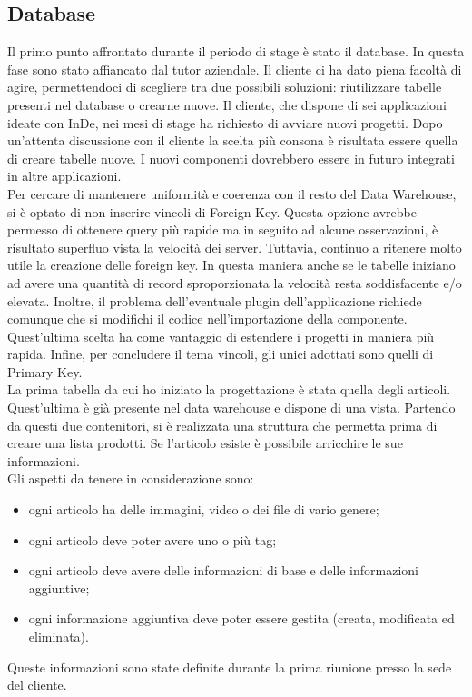 \subsection{Database}
Il primo punto affrontato durante il periodo di stage è stato il database. In questa fase sono stato affiancato dal tutor aziendale. Il cliente ci ha dato piena facoltà di agire, permettendoci di scegliere tra due possibili soluzioni: riutilizzare tabelle presenti nel database o crearne nuove. 
Il cliente, che dispone di sei applicazioni ideate con InDe, nei mesi di stage ha richiesto di avviare nuovi progetti.
Dopo un'attenta discussione con il cliente la scelta più consona è risultata essere quella di creare tabelle nuove. I nuovi componenti dovrebbero essere in futuro integrati in altre applicazioni.\\
Per cercare di mantenere uniformità e coerenza con il resto del Data Warehouse, si è optato di non inserire vincoli di Foreign Key.
Questa opzione avrebbe permesso di ottenere query più rapide ma in seguito ad alcune osservazioni, è risultato superfluo vista la velocità dei server. 
Tuttavia, continuo a ritenere molto utile la creazione delle foreign key. In questa maniera anche se le tabelle iniziano ad avere una quantità di record sproporzionata la velocità resta soddisfacente e/o elevata. Inoltre, il problema dell'eventuale plugin dell'applicazione richiede comunque che si modifichi il codice nell'importazione della componente. 
Quest'ultima scelta ha come vantaggio di estendere i progetti in maniera più rapida.
Infine, per concludere il tema vincoli, gli unici adottati sono quelli di Primary Key.
\\

La prima tabella da cui ho iniziato la progettazione è stata quella degli articoli. Quest'ultima è già presente nel data warehouse e dispone di una vista. Partendo da questi due contenitori, si è realizzata una struttura che permetta prima di creare una lista prodotti. Se l'articolo esiste è possibile arricchire le sue informazioni.\\

Gli aspetti da tenere in considerazione sono:
\begin{itemize}
	\item ogni articolo ha delle immagini, video o dei file di vario genere;
	\item ogni articolo deve poter avere uno o più tag;
	\item ogni articolo deve avere delle informazioni di base e delle informazioni aggiuntive;
	\item ogni informazione aggiuntiva deve poter essere gestita (creata, modificata ed eliminata).
\end{itemize}
Queste informazioni sono state definite durante la prima riunione presso la sede del cliente.\\

